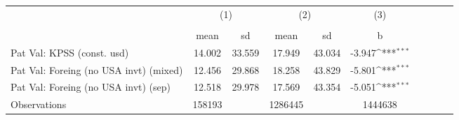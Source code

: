 {
\def\sym#1{\ifmmode^{#1}\else\(^{#1}\)\fi}
\begin{tabular}{l*{3}{ccc}}
\hline\hline
                    &\multicolumn{2}{c}{(1)}  &\multicolumn{2}{c}{(2)}  &\multicolumn{1}{c}{(3)}\\
                    &\multicolumn{2}{c}{}     &\multicolumn{2}{c}{}     &\multicolumn{1}{c}{} \\
                    &        mean&          sd&        mean&          sd&           b         \\
\hline
Pat Val: KPSS (const. usd)&      14.002&      33.559&      17.949&      43.034&      -3.947\sym{***}\\
Pat Val: Foreing (no USA invt) (mixed)&      12.456&      29.868&      18.258&      43.829&      -5.801\sym{***}\\
Pat Val: Foreing (no USA invt) (sep)&      12.518&      29.978&      17.569&      43.354&      -5.051\sym{***}\\
\hline
Observations        &      158193&            &     1286445&            &     1444638         \\
\hline\hline
\end{tabular}
}
